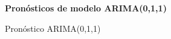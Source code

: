 %
%
\begin{figure}[H]
	\centering
	\textbf{Pronósticos de modelo ARIMA(0,1,1)}\par\medskip
	\caption{Pronóstico ARIMA(0,1,1)}\label{fig25}
\end{figure}
